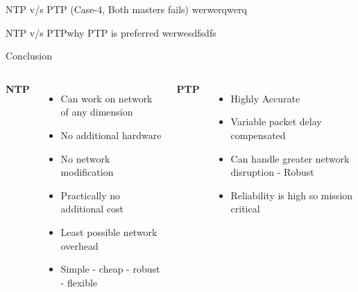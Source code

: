 \documentclass{beamer}
\begin{document}
    \begin{frame}{NTP v/s PTP \small(Case-4, Both masters fails)}
werwerqwerq
    \end{frame}
    \begin{frame}{NTP v/s PTP\small why PTP is preferred}
werwesdfsdfs
    \end{frame}

    \begin{frame}{Conclusion}
\begin{columns}
	\textbf{NTP}
	\begin{itemize}
		\item Can work on network of any dimension
		\item No additional hardware
		\item No network modification
		\item Practically no additional cost
		\item Least possible network overhead
		\item Simple - cheap - robust - flexible
	\end{itemize}
	
	\textbf{PTP}
	\begin{itemize}
		\item  Highly Accurate 
		\item Variable packet delay compensated
		\item  Can handle greater network disruption - Robust
		\item Reliability is high so mission critical
	\end{itemize}
	\vspace{1.7cm}
\end{columns}
    \end{frame}
\end{document}
